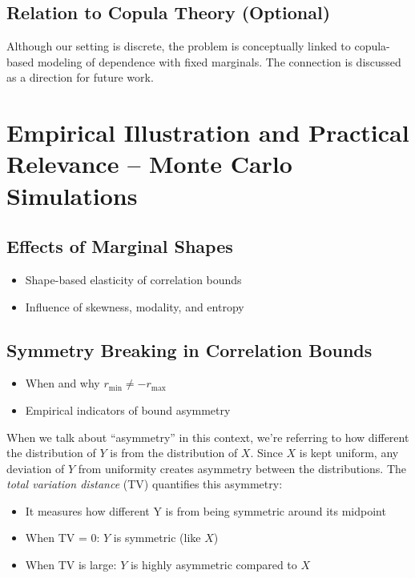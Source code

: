 \documentclass[
  12pt,
]{article}
\providecommand{\tightlist}{%
  \setlength{\itemsep}{0pt}\setlength{\parskip}{0pt}}\usepackage{longtable,booktabs,array}
\theoremstyle{plain}
\theoremstyle{definition}
\theoremstyle{remark}
\begin{document}
\subsection{Relation to Copula Theory
(Optional)}\label{relation-to-copula-theory-optional}

Although our setting is discrete, the problem is conceptually linked to
copula-based modeling of dependence with fixed marginals. The connection
is discussed as a direction for future work.

\section{Empirical Illustration and Practical Relevance -- Monte Carlo
Simulations}\label{empirical-illustration-and-practical-relevance-monte-carlo-simulations}

\subsection{Effects of Marginal
Shapes}\label{effects-of-marginal-shapes}

\begin{itemize}
\tightlist
\item
  Shape-based elasticity of correlation bounds\\
\item
  Influence of skewness, modality, and entropy
\end{itemize}

\subsection{Symmetry Breaking in Correlation
Bounds}\label{symmetry-breaking-in-correlation-bounds}

\begin{itemize}
\tightlist
\item
  When and why \(r_{\min} \neq -r_{\max}\)
\item
  Empirical indicators of bound asymmetry
\end{itemize}

When we talk about ``asymmetry'' in this context, we're referring to how
different the distribution of \(Y\) is from the distribution of \(X\).
Since \(X\) is kept uniform, any deviation of \(Y\) from uniformity
creates asymmetry between the distributions. The \emph{total variation
distance} (TV) quantifies this asymmetry:

\begin{itemize}
\tightlist
\item
  It measures how different Y is from being symmetric around its
  midpoint
\item
  When TV = 0: \(Y\) is symmetric (like \(X\))
\item
  When TV is large: \(Y\) is highly asymmetric compared to \(X\)
\end{itemize}
\end{document}
